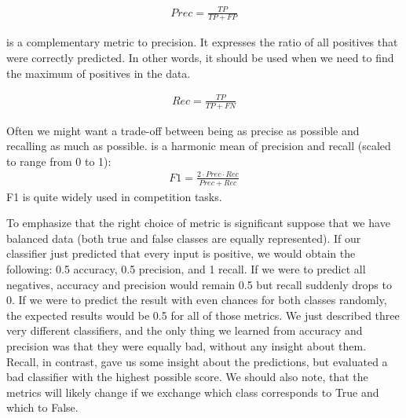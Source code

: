 \begin{align} 
Prec = \frac{TP}{TP + FP}
\end{align}

 is a complementary metric to precision. It expresses the ratio of all positives that were correctly predicted. In other words, it should be used when we need to find the maximum of positives in the data.

\begin{align}
Rec = \frac{TP}{TP + FN}
\end{align}

Often we might want a trade-off between being as precise as possible and recalling as much as possible.  is a harmonic mean of precision and recall (scaled to range from 0 to 1): \begin{align}
F1 = \frac{2 \cdot Prec \cdot Rec}{Prec + Rec}
\end{align}
F1 is quite widely used in competition tasks.






To emphasize that the right choice of metric is significant suppose that we have balanced data (both true and false classes are equally represented). If our classifier just predicted that every input is positive, we would obtain the following: 0.5 accuracy, 0.5 precision, and 1 recall. If we were to predict all negatives, accuracy and precision would remain 0.5 but recall suddenly drops to 0. If we were to predict the result with even chances for both classes randomly, the expected results would be 0.5 for all of those metrics. We just described three very different classifiers, and the only thing we learned from accuracy and precision was that they were equally bad, without any insight about them. Recall, in contrast, gave us some insight about the predictions, but evaluated a bad classifier with the highest possible score. We should also note, that the metrics will likely change if we exchange which class corresponds to True and which to False. 

